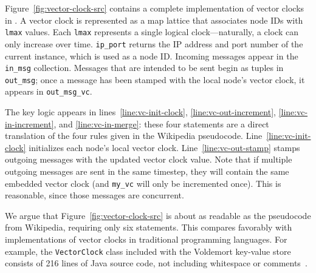 Figure~\ref{fig:vector-clock-src} contains a complete implementation of vector
clocks in \lang. A vector clock is represented as a map lattice that associates
node IDs with \texttt{lmax} values. Each \texttt{lmax} represents a single
logical clock---naturally, a clock can only increase over time.
\texttt{ip\_port} returns the IP address and port number of the current \lang
instance, which is used as a node ID. Incoming messages appear in the
\texttt{in\_msg} collection. Messages that are intended to be sent begin as
tuples in \texttt{out\_msg}; once a message has been stamped with the local
node's vector clock, it appears in \texttt{out\_msg\_vc}.

The key logic appears in lines~\ref{line:vc-init-clock}, \ref{line:vc-out-increment},
\ref{line:vc-in-increment}, and \ref{line:vc-in-merge}: these four statements
are a direct translation of the four rules  given in the Wikipedia pseudocode. Line~\ref{line:vc-init-clock} initializes each node's local vector clock.
Line~\ref{line:vc-out-stamp} stamps outgoing messages with the updated
vector clock value.  Note that if multiple outgoing messages are sent in the
same \lang timestep, they will contain the same embedded vector clock (and
\texttt{my\_vc} will only be incremented once). This is reasonable, since those
messages are concurrent.

We argue that Figure~\ref{fig:vector-clock-src} is about as readable as the pseudocode from Wikipedia, requiring
only six \lang statements. This compares favorably with implementations of
vector clocks in traditional programming languages. For example, the
\texttt{VectorClock} class included with the Voldemort key-value store consists
of 216 lines of Java source code, not including whitespace or
comments~\cite{voldemort-vector-clock}.

